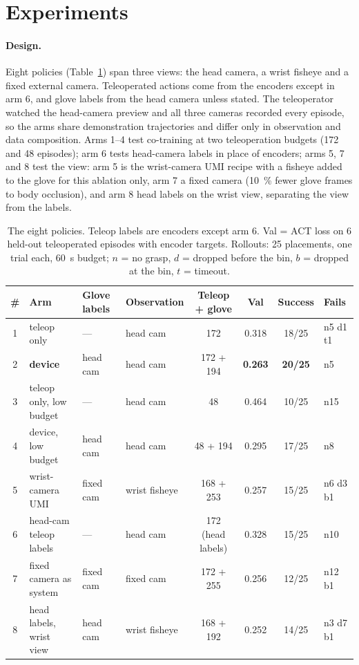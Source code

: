 \section{Experiments}
\label{sec:results}

\paragraph{Design.}
Eight policies (Table~\ref{tab:arms}) span three views: the head camera, a wrist fisheye and a fixed external camera. Teleoperated actions come from the encoders except in arm 6, and glove labels from the head camera unless stated. The teleoperator watched the head-camera preview and all three cameras recorded every episode, so the arms share demonstration trajectories and differ only in observation and data composition. Arms 1--4 test co-training at two teleoperation budgets (172 and 48 episodes); arm 6 tests head-camera labels in place of encoders; arms 5, 7 and 8 test the view: arm 5 is the wrist-camera UMI recipe \citep{chi2024umi} with a fisheye added to the glove for this ablation only, arm 7 a fixed camera (\SI{10}{\percent} fewer glove frames to body occlusion), and arm 8 head labels on the wrist view, separating the view from the labels.

\begin{table}[t]
  \centering
  \footnotesize
  \caption{The eight policies. Teleop labels are encoders except arm 6. Val = ACT loss on 6 held-out teleoperated episodes with encoder targets. Rollouts: 25 placements, one trial each, \SI{60}{s} budget; $n$ = no grasp, $d$ = dropped before the bin, $b$ = dropped at the bin, $t$ = timeout.}
  \label{tab:arms}
  \setlength{\tabcolsep}{4pt}
  \begin{tabular}{clllcccl}
    \toprule
    \# & Arm & Glove labels & Observation & Teleop + glove & Val & Success & Fails \\
    \midrule
    1 & teleop only & --- & head cam & 172 & 0.318 & 18/25 & n5 d1 t1 \\
    2 & \textbf{device} & head cam & head cam & 172 + 194 & \textbf{0.263} & \textbf{20/25} & n5 \\
    3 & teleop only, low budget & --- & head cam & 48 & 0.464 & 10/25 & n15 \\
    4 & device, low budget & head cam & head cam & 48 + 194 & 0.295 & 17/25 & n8 \\
    5 & wrist-camera UMI & fixed cam & wrist fisheye & 168 + 253 & 0.257 & 15/25 & n6 d3 b1 \\
    6 & head-cam teleop labels & --- & head cam & 172 (head labels) & 0.328 & 15/25 & n10 \\
    7 & fixed camera as system & fixed cam & fixed cam & 172 + 255 & 0.256 & 12/25 & n12 b1 \\
    8 & head labels, wrist view & head cam & wrist fisheye & 168 + 192 & 0.252 & 14/25 & n3 d7 b1 \\
    \bottomrule
  \end{tabular}
\end{table}

